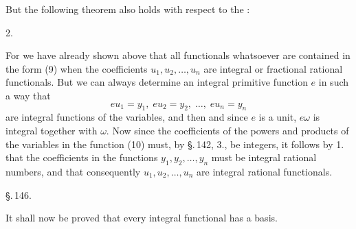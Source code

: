 But the following theorem also holds with respect to the :

2. 

For we have already shown above that all functionals whatsoever are contained in the form (9) when the coefficients $u_1, u_2, \ldots, u_n$ are integral or fractional rational functionals. But we can always determine an integral primitive function $e$ in such a way that
\[
e u_1 = y_1, \; e u_2 = y_2, \; \ldots, \; e u_n = y_n
\]
are integral functions of the variables, and then
and since $e$ is a unit, $e\omega$ is integral together with $\omega$. Now since the coefficients of the powers and products of the variables in the function (10) must, by \S.\,142, 3., be integers, it follows by 1. that the coefficients in the functions $y_1, y_2, \ldots, y_n$ must be integral rational numbers, and that consequently $u_1, u_2, \ldots, u_n$ are integral rational functionals.

\begin{center}
\S.\,146.

\end{center}


It shall now be proved that every integral functional has a basis.
